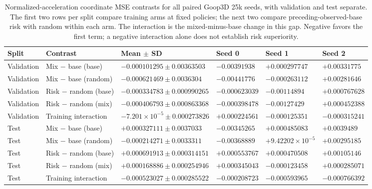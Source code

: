 \begin{table}[p]
\centering\scriptsize
\caption{Normalized-acceleration coordinate MSE contrasts for all paired Goop3D 25k seeds, with validation and test separate. The first two rows per split compare training arms at fixed policies; the next two compare preceding-observed-base risk with random within each arm. The interaction is the mixed-minus-base change in this gap. Negative favors the first term; a negative interaction alone does not establish risk superiority.}
\label{tab:goop3d25k-observed-normalized-contrasts}
\setlength{\tabcolsep}{3pt}
\begin{tabular}{llllll}
\toprule
Split & Contrast & Mean $\pm$ SD & Seed 0 & Seed 1 & Seed 2\\
\midrule
Validation & Mix $-$ base (base) & $-0.000101295\pm0.00363503$ & $-0.00391938$ & $+0.000297747$ & $+0.00331775$\\
Validation & Mix $-$ base (random) & $-0.000621469\pm0.0036304$ & $-0.00441776$ & $-0.000263112$ & $+0.00281646$\\
Validation & Risk $-$ random (base) & $-0.000334783\pm0.000990265$ & $-0.000623039$ & $-0.00114894$ & $+0.000767628$\\
Validation & Risk $-$ random (mix) & $-0.000406793\pm0.000863368$ & $-0.000398478$ & $-0.00127429$ & $+0.000452388$\\
Validation & Training interaction & $-7.201\!\times\!10^{-5}\pm0.000273826$ & $+0.000224561$ & $-0.000125351$ & $-0.000315241$\\
Test & Mix $-$ base (base) & $+0.000327111\pm0.0037033$ & $-0.00345265$ & $+0.000485083$ & $+0.0039489$\\
Test & Mix $-$ base (random) & $-0.000214271\pm0.0033311$ & $-0.00368889$ & $+9.42202\!\times\!10^{-5}$ & $+0.00295185$\\
Test & Risk $-$ random (base) & $+0.000691913\pm0.000314151$ & $+0.000553767$ & $+0.000470508$ & $+0.00105146$\\
Test & Risk $-$ random (mix) & $+0.000168886\pm0.000254946$ & $+0.000345043$ & $-0.000123458$ & $+0.000285071$\\
Test & Training interaction & $-0.000523027\pm0.000285522$ & $-0.000208723$ & $-0.000593965$ & $-0.000766392$\\
\bottomrule
\end{tabular}
\end{table}

